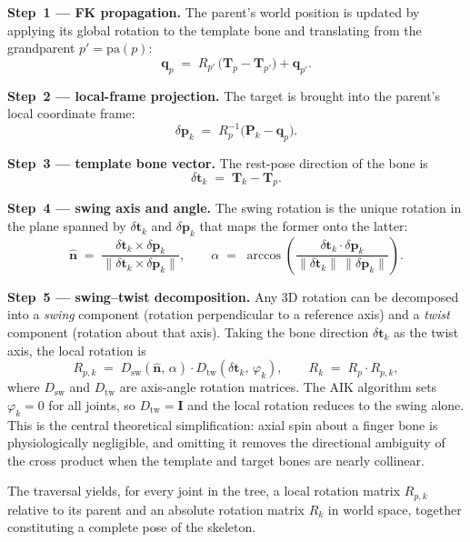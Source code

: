 \textbf{Step~1 --- FK propagation.}
The parent's world position is updated by applying its global rotation to the
template bone and translating from the grandparent $p' = \mathrm{pa}(p)$:
\begin{equation}
  \mathbf{q}_{p} \;=\;
  R_{p'}\,\bigl(\mathbf{T}_{p} - \mathbf{T}_{p'}\bigr) + \mathbf{q}_{p'}.
\end{equation}

\textbf{Step~2 --- local-frame projection.}
The target is brought into the parent's local coordinate frame:
\begin{equation}
  \delta\mathbf{p}_k \;=\; R_{p}^{-1}
  \bigl(\mathbf{P}_k - \mathbf{q}_{p}\bigr).
\end{equation}

\textbf{Step~3 --- template bone vector.}
The rest-pose direction of the bone is
\begin{equation}
  \delta\mathbf{t}_k \;=\; \mathbf{T}_k - \mathbf{T}_{p}.
\end{equation}

\textbf{Step~4 --- swing axis and angle.}
The swing rotation is the unique rotation in the plane spanned by
$\delta\mathbf{t}_k$ and $\delta\mathbf{p}_k$ that maps the former onto the
latter:
\begin{equation}\label{eq:swing}
  \hat{\mathbf{n}} \;=\;
  \frac{\delta\mathbf{t}_k \times \delta\mathbf{p}_k}
       {\|\delta\mathbf{t}_k \times \delta\mathbf{p}_k\|},
  \qquad
  \alpha \;=\; \arccos\!\left(
    \frac{\delta\mathbf{t}_k \cdot \delta\mathbf{p}_k}
         {\|\delta\mathbf{t}_k\|\,\|\delta\mathbf{p}_k\|}
  \right).
\end{equation}

\textbf{Step~5 --- swing--twist decomposition.}
Any 3D rotation can be decomposed into a \emph{swing} component (rotation
perpendicular to a reference axis) and a \emph{twist} component (rotation
about that axis). Taking the bone direction $\delta\mathbf{t}_k$ as the twist
axis, the local rotation is
\begin{equation}\label{eq:local_rot}
  R_{p,k} \;=\;
  D_{\mathrm{sw}}(\hat{\mathbf{n}},\,\alpha)
  \cdot
  D_{\mathrm{tw}}(\delta\mathbf{t}_k,\,\varphi_k),
  \qquad
  R_k \;=\; R_{p} \cdot R_{p,k},
\end{equation}
where $D_{\mathrm{sw}}$ and $D_{\mathrm{tw}}$ are axis-angle rotation matrices.
The AIK algorithm sets $\varphi_k = 0$ for all joints, so
$D_{\mathrm{tw}} = \mathbf{I}$ and the local rotation reduces to the swing
alone. This is the central theoretical simplification: axial spin about a
finger bone is physiologically negligible, and omitting it removes the
directional ambiguity of the cross product when the template and target bones
are nearly collinear.

The traversal yields, for every joint in the tree, a local rotation matrix
$R_{p,k}$ relative to its parent and an absolute rotation matrix $R_k$ in
world space, together constituting a complete pose of the skeleton.
